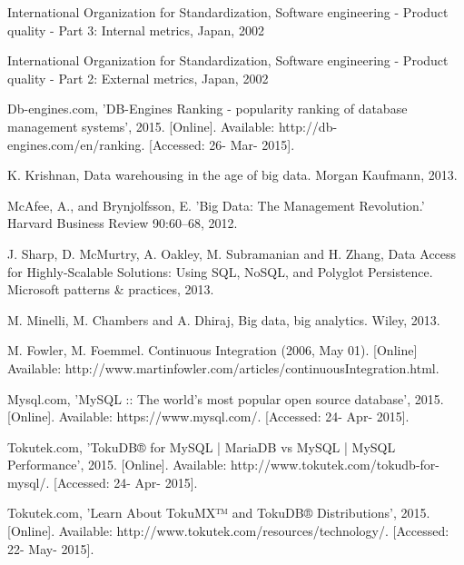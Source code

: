 \begin{thebibliography}{69}
 International Organization for Standardization, Software engineering - Product quality - Part 3: Internal metrics, Japan, 2002

 International Organization for Standardization, Software engineering - Product quality - Part 2: External metrics, Japan, 2002   

 Db-engines.com, 'DB-Engines Ranking - popularity ranking of database management systems', 2015. [Online]. Available: http://db-engines.com/en/ranking. [Accessed: 26- Mar- 2015].



 K. Krishnan, Data warehousing in the age of big data. Morgan Kaufmann, 2013.

 McAfee, A., and Brynjolfsson, E. 'Big Data: The Management Revolution.' Harvard Business Review 90:60–68, 2012.

 J.  Sharp, D.  McMurtry, A.  Oakley, M.  Subramanian and H.  Zhang, Data Access for Highly-Scalable Solutions: Using SQL, NoSQL, and Polyglot Persistence. Microsoft patterns \& practices, 2013.

M. Minelli, M. Chambers and A. Dhiraj, Big data, big analytics. Wiley, 2013. 


 M. Fowler, M. Foemmel. Continuous Integration (2006, May 01). [Online] Available: http://www.martinfowler.com/articles/continuousIntegration.html. 

 Mysql.com, 'MySQL ::  The world's most popular open source database', 2015. [Online]. Available: https://www.mysql.com/. [Accessed: 24- Apr- 2015].

 Tokutek.com, 'TokuDB® for MySQL | MariaDB vs MySQL | MySQL Performance', 2015. [Online]. Available: http://www.tokutek.com/tokudb-for-mysql/. [Accessed: 24- Apr- 2015].

 Tokutek.com, 'Learn About TokuMX™ and TokuDB® Distributions', 2015. [Online]. Available: http://www.tokutek.com/resources/technology/. [Accessed: 22- May- 2015].


\end{thebibliography}
